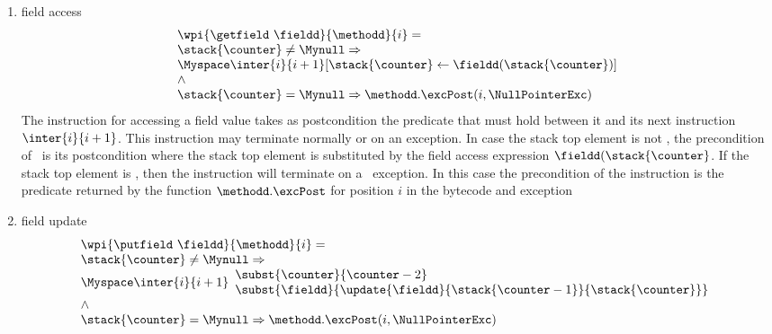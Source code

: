 \begin{itemize}
\begin{enumerate}
			\item field access  \\
				 $$ 	\begin{array}{l} \wpi{\getfield  \ \fieldd } {\methodd}{i}  =  \\
				 		\stack{\counter } \ne \Mynull \Rightarrow \\
						      \Myspace	\inter{i}{i+1}[ \stack{\counter } \leftarrow \fieldd ( \stack{\counter } ) ] \\
									 \wedge \\
						\stack{\counter } = \Mynull \Rightarrow \methodd.\excPost( i, \NullPointerExc) 
					\end{array} 
					$$
			  The instruction for accessing a field value takes as postcondition the predicate that must hold between it and its next instruction
			  $\inter{i}{i+1}$.  This instruction may terminate normally or on an exception.
			  In case the stack top element is not \Mynull, the precondition of \getfield \ is its postcondition where the stack 
			  top element is substituted by the field access expression $\fieldd ( \stack{\counter }$.
			  If the stack top element is \Mynull, then the instruction will terminate on  a \NullPointerExc \ exception. In this case the precondition
			  of the instruction is the predicate returned by the function $\methodd.\excPost$ for position $i$ in the bytecode and exception \NullPointerExc
			  
			\item  field update \\
			$$\begin{array}{l}
                                  \wpi{\putfield  \ \fieldd } {\methodd}{i}  =  \\
				 		\stack{\counter } \ne \Mynull \Rightarrow \\
						 \Myspace \inter{i}{i+1}
                                                     \begin{array}{l}
                                                              \subst{ \counter }{  \counter -2 } \\
							     \subst{  \fieldd}{ \update{\fieldd}{ \stack{\counter - 1}}{  \stack{\counter} } }
						       \end{array} 
						        \\
							\wedge \\
							\stack{\counter } = \Mynull \Rightarrow   \methodd.\excPost( i, \NullPointerExc ) \\
					  \end{array} 
					$$
			                

\end{enumerate}
\end{itemize}
